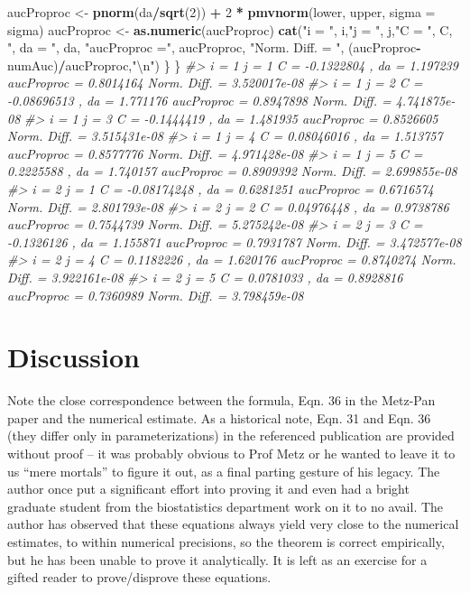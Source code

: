 \documentclass[]{book}
\newenvironment{Shaded}{\begin{snugshade}}{\end{snugshade}}
\newcommand{\CharTok}[1]{\textcolor[rgb]{0.31,0.60,0.02}{#1}}
\newcommand{\CommentTok}[1]{\textcolor[rgb]{0.56,0.35,0.01}{\textit{#1}}}
\newcommand{\DataTypeTok}[1]{\textcolor[rgb]{0.13,0.29,0.53}{#1}}
\newcommand{\DecValTok}[1]{\textcolor[rgb]{0.00,0.00,0.81}{#1}}
\newcommand{\KeywordTok}[1]{\textcolor[rgb]{0.13,0.29,0.53}{\textbf{#1}}}
\newcommand{\NormalTok}[1]{#1}
\newcommand{\OperatorTok}[1]{\textcolor[rgb]{0.81,0.36,0.00}{\textbf{#1}}}
\newcommand{\StringTok}[1]{\textcolor[rgb]{0.31,0.60,0.02}{#1}}
\begin{document}
\begin{Shaded}
\begin{Highlighting}[]
\NormalTok{    aucProproc <-}\StringTok{ }\KeywordTok{pnorm}\NormalTok{(da}\OperatorTok{/}\KeywordTok{sqrt}\NormalTok{(}\DecValTok{2}\NormalTok{)) }\OperatorTok{+}\StringTok{ }\DecValTok{2} \OperatorTok{*}\StringTok{ }\KeywordTok{pmvnorm}\NormalTok{(lower, upper, }\DataTypeTok{sigma =}\NormalTok{ sigma)}
\NormalTok{    aucProproc <-}\StringTok{  }\KeywordTok{as.numeric}\NormalTok{(aucProproc)}
    \KeywordTok{cat}\NormalTok{(}\StringTok{"i = "}\NormalTok{, i,}\StringTok{"j = "}\NormalTok{, j,}\StringTok{"C = "}\NormalTok{, C, }\StringTok{", da = "}\NormalTok{, da, }\StringTok{"aucProproc ="}\NormalTok{, aucProproc, }\StringTok{"Norm. Diff. = "}\NormalTok{, (aucProproc}\OperatorTok{-}\NormalTok{numAuc)}\OperatorTok{/}\NormalTok{aucProproc,}\StringTok{"}\CharTok{\textbackslash{}n}\StringTok{"}\NormalTok{)}
\NormalTok{  \}}
\NormalTok{\}}
\CommentTok{#> i =  1 j =  1 C =  -0.1322804 , da =  1.197239 aucProproc = 0.8014164 Norm. Diff. =  3.520017e-08 }
\CommentTok{#> i =  1 j =  2 C =  -0.08696513 , da =  1.771176 aucProproc = 0.8947898 Norm. Diff. =  4.741875e-08 }
\CommentTok{#> i =  1 j =  3 C =  -0.1444419 , da =  1.481935 aucProproc = 0.8526605 Norm. Diff. =  3.515431e-08 }
\CommentTok{#> i =  1 j =  4 C =  0.08046016 , da =  1.513757 aucProproc = 0.8577776 Norm. Diff. =  4.971428e-08 }
\CommentTok{#> i =  1 j =  5 C =  0.2225588 , da =  1.740157 aucProproc = 0.8909392 Norm. Diff. =  2.699855e-08 }
\CommentTok{#> i =  2 j =  1 C =  -0.08174248 , da =  0.6281251 aucProproc = 0.6716574 Norm. Diff. =  2.801793e-08 }
\CommentTok{#> i =  2 j =  2 C =  0.04976448 , da =  0.9738786 aucProproc = 0.7544739 Norm. Diff. =  5.275242e-08 }
\CommentTok{#> i =  2 j =  3 C =  -0.1326126 , da =  1.155871 aucProproc = 0.7931787 Norm. Diff. =  3.472577e-08 }
\CommentTok{#> i =  2 j =  4 C =  0.1182226 , da =  1.620176 aucProproc = 0.8740274 Norm. Diff. =  3.922161e-08 }
\CommentTok{#> i =  2 j =  5 C =  0.0781033 , da =  0.8928816 aucProproc = 0.7360989 Norm. Diff. =  3.798459e-08}
\end{Highlighting}
\end{Shaded}

\hypertarget{discussion-1}{%
\section{Discussion}\label{discussion-1}}

Note the close correspondence between the formula, Eqn. 36 in the Metz-Pan paper and the numerical estimate. As a historical note, Eqn. 31 and Eqn. 36 (they differ only in parameterizations) in the referenced publication are provided without proof -- it was probably obvious to Prof Metz or he wanted to leave it to us ``mere mortals'' to figure it out, as a final parting gesture of his legacy. The author once put a significant effort into proving it and even had a bright graduate student from the biostatistics department work on it to no avail. The author has observed that these equations always yield very close to the numerical estimates, to within numerical precisions, so the theorem is correct empirically, but he has been unable to prove it analytically. It is left as an exercise for a gifted reader to prove/disprove these equations.
\end{document}
